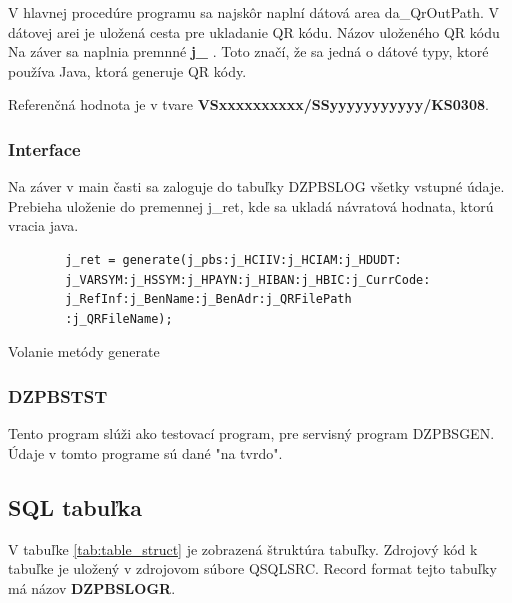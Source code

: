 V hlavnej procedúre programu sa najskôr naplní dátová area da\_QrOutPath. V dátovej arei je uložená cesta pre ukladanie QR kódu. Názov uloženého QR kódu  Na záver sa naplnia premnné \textbf{j\_} . Toto značí, že sa jedná o dátové typy, ktoré používa Java, ktorá generuje QR kódy.

Referenčná hodnota je v tvare \textbf{VSxxxxxxxxxx/SSyyyyyyyyyyy/KS0308}.

\subsubsection*{Interface}

Na záver v main časti sa zaloguje do tabuľky DZPBSLOG všetky vstupné údaje. Prebieha uloženie do premennej j\_ret, kde sa ukladá návratová hodnata, ktorú vracia java. 

\begin{listing}[!ht]
\label{exmpl:generate}
\begin{center}
    \begin{verbatim}
        j_ret = generate(j_pbs:j_HCIIV:j_HCIAM:j_HDUDT:
        j_VARSYM:j_HSSYM:j_HPAYN:j_HIBAN:j_HBIC:j_CurrCode:                       
        j_RefInf:j_BenName:j_BenAdr:j_QRFilePath                 
        :j_QRFileName);                                          
    \end{verbatim}
    \caption{Volanie metódy generate}
\end{center}
\end{listing}
\subsubsection{DZPBSTST}

Tento program slúži ako testovací program, pre servisný program DZPBSGEN. Údaje v tomto programe sú dané "na tvrdo". 

\subsection{\acs{SQL} tabuľka}

V tabuľke \ref{tab:table_struct} je zobrazená štruktúra tabuľky. Zdrojový kód k tabuľke je uložený v zdrojovom súbore QSQLSRC.  Record format tejto tabuľky má názov \textbf{DZPBSLOGR}. 

